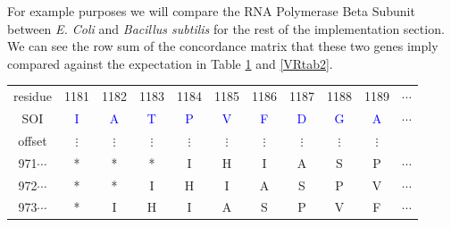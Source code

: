 \documentclass[phd,tocprelim]{cornell}
\begin{document}
For example purposes we will compare the RNA Polymerase Beta Subunit between {\it E. Coli} and {\it Bacillus subtilis} \cite{GenBank} for the rest of the implementation section. We can see the row sum of the concordance matrix that these two genes imply compared against the expectation in Table \ref{VRtab1} and \ref{VRtab2}.

\begin{table}[htp]
    
    \label{VRtab1}
\begin{center}
{\small
\begin{tabular}{|ccccccccccc|}                                                                                                     
\hline                                                                                                                                      
\scriptsize{residue} & \small{1181} &  \small{1182} &  \small{1183} &  \small{1184} &  \small{1185} &  \small{1186} &  \small{1187} &  \small{1188} &  \small{1189} & \small{}$\cdots$ \\                                                                                             
SOI & \textcolor{blue}{I} &  \textcolor{blue}{A} &  \textcolor{blue}{T} &  \textcolor{blue}{P} &  \textcolor{blue}{V} &  \textcolor{blue}{F} &  \textcolor{blue}{D} &  \textcolor{blue}{G} &  \textcolor{blue}{A} & $\cdots$ \\                                                                                                                                                                                
\hline                                                                                                                                                                                                      
\scriptsize{offset} & $\vdots$ &  $\vdots$ &  $\vdots$ & $\vdots$ &  $\vdots$ &  $\vdots$ & $\vdots$ &  $\vdots$ &  $\vdots$ & \\                                                                                                                                                                          
\small{971}$\cdots$ & * & * & * & I & H & I & A & S & P & $\cdots$ \\                                                                                  
\small{972}$\cdots$ & * & * & I & H & I & A & S & P & V & $\cdots$ \\                                                                                  
\small{973}$\cdots$ & * & I & H & I & A & S & P & V & F & $\cdots$ \\                                                                                  

\end{tabular}}
\end{center}
\end{table}
\end{document}
